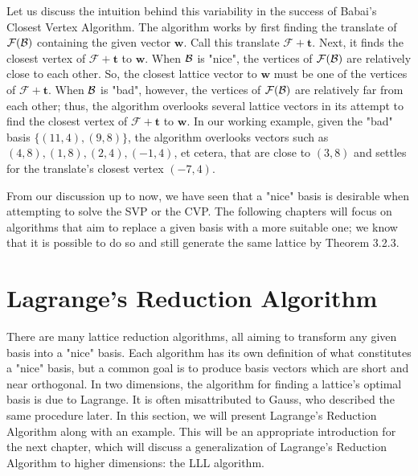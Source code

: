 \documentclass[a4paper,12pt]{article}
\begin{document}
Let us discuss the intuition behind this variability in the success of Babai's Closest Vertex Algorithm. The algorithm works by first finding the translate of $\mathcal{F}(\mathcal{B})$ containing the given vector $\mathbf{w}$. Call this translate $\mathcal{F} + \mathbf{t}$. Next, it finds the closest vertex of $\mathcal{F} + \mathbf{t}$ to $\mathbf{w}$. When $\mathcal{B}$ is "nice", the vertices of $\mathcal{F}(\mathcal{B})$ are relatively close to each other. So, the closest lattice vector to $\mathbf{w}$ must be one of the vertices of $\mathcal{F} + \mathbf{t}$. When $\mathcal{B}$ is "bad", however, the vertices of $\mathcal{F}(\mathcal{B})$ are relatively far from each other; thus, the algorithm overlooks several lattice vectors in its attempt to find the closest vertex of $\mathcal{F} + \mathbf{t}$ to $\mathbf{w}$. In our working example, given the "bad" basis $\lbrace (11,4), (9,8)\rbrace$, the algorithm overlooks vectors such as $(4,8), (1,8), (2,4), (-1,4)$, et cetera, that are close to $(3,8)$ and settles for the translate's closest vertex $(-7,4)$.

From our discussion up to now, we have seen that a "nice" basis is desirable when attempting to solve the SVP or the CVP. The following chapters will focus on algorithms that aim to replace a given basis with a more suitable one; we know that it is possible to do so and still generate the same lattice by Theorem 3.2.3.

\newpage

\section{Lagrange's Reduction Algorithm}\label{Lagrange}

There are many lattice reduction algorithms, all aiming to transform any given basis into a "nice" basis. Each algorithm has its own definition of what constitutes a "nice" basis, but a common goal is to produce basis vectors which are short and near orthogonal. In two dimensions, the algorithm for finding a lattice's optimal basis is due to Lagrange. It is often misattributed to Gauss, who described the same procedure later. In this section, we will present Lagrange's Reduction Algorithm along with an example. This will be an appropriate introduction for the next chapter, which will discuss a generalization of Lagrange's Reduction Algorithm to higher dimensions: the LLL algorithm. 
\end{document}
